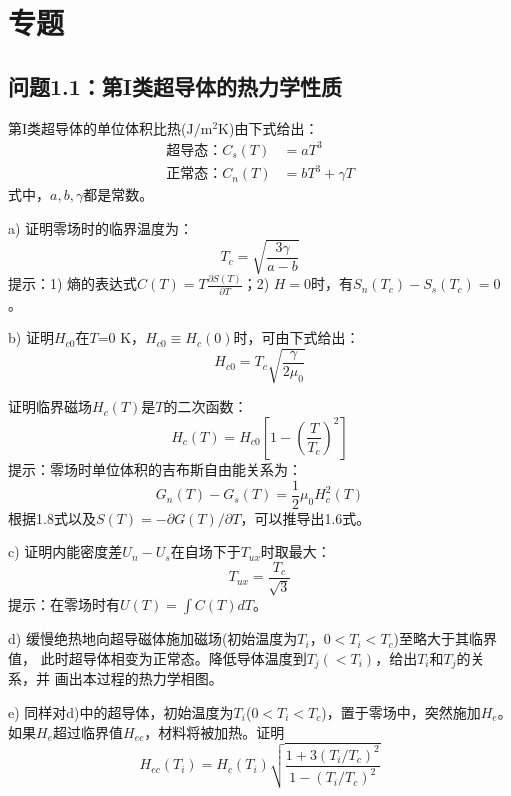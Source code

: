 \section{专题}
\subsection{问题1.1：第I类超导体的热力学性质}
第I类超导体的单位体积比热($\mathrm{J/m^2K}$)由下式给出：
\begin{subequations}\label{eqn:1.4ab}
	\begin{align}
\mbox{超导态：} C_s(T) &= aT^3 \\
\mbox{正常态：} C_n(T)&= bT^3+\gamma T	
	\end{align}
\end{subequations}
式中，$a,b,\gamma$都是常数。

a) 证明零场时的临界温度为：
\begin{equation}\label{eqn:1.5}
  T_c=\sqrt{\frac{3\gamma}{a-b}}
\end{equation}
提示：1) 熵的表达式$C(T)=T\frac{\partial S(T)}{\partial T}$；2) $H=0$时，有$S_n(T_c)-S_s(T_c)=0$。

b) 证明$H_{c0}$在$T$=0 K，$H_{c0}\equiv H_c(0)$时，可由下式给出：
\begin{equation}\label{eqn:1.6}
  H_{c0}=T_c \sqrt{\frac{\gamma}{2\mu_0}}
\end{equation}

证明临界磁场$H_c(T)$是$T$的二次函数：
\begin{equation}\label{eqn:1.7}
  H_c(T)=H_{c0}\left[1-\left(\frac{T}{T_c}\right)^2\right]
\end{equation}
提示：零场时单位体积的吉布斯自由能关系为：
\begin{equation}\label{eqn:1.8}
  G_n(T)-G_s(T)=\frac{1}{2}\mu_0 H_c^2(T)
\end{equation}
根据1.8式以及$S(T)=-\partial G(T)/\partial T$，可以推导出1.6式。

c) 证明内能密度差$U_n-U_s$在自场下于$T_{ux}$时取最大：
\begin{equation}
  T_{ux}=\frac{T_c}{\sqrt{3}}
\end{equation}
提示：在零场时有$U(T)=\int C(T)dT$。

d) 缓慢绝热地向超导磁体施加磁场(初始温度为$T_i$，$0<T_i<T_c$)至略大于其临界值，
此时超导体相变为正常态。降低导体温度到$T_j (<T_i)$，给出$T_i$和$T_j$的关系，并
画出本过程的热力学相图。

e) 同样对d)中的超导体，初始温度为$T_i$($0<T_i<T_c$)，置于零场中，突然施加$H_e$。
如果$H_e$超过临界值$H_{ec}$，材料将被加热。证明
\begin{equation}
  H_{ec}(T_i)=H_c(T _i)\sqrt{\frac{1+3(T_i/T_c)^2}{1-(T_i/T_c)^2}}
\end{equation}

